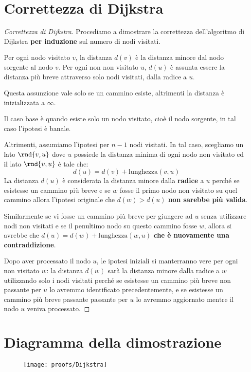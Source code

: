 \documentclass[\main/main.tex]{subfiles}
\begin{document}
\section{Correttezza di Dijkstra}
\begin{proof}[Correttezza di Dijkstra]
  Procediamo a dimostrare la correttezza dell'algoritmo di Dijkstra \textbf{per induzione} sul numero di nodi visitati.

  Per ogni nodo visitato \(v\), la distanza \(d(v)\) è la distanza minore dal nodo sorgente al nodo \(v\). Per ogni non non visitato \(u\), \(d(u)\) è assunta essere la distanza più breve attraverso solo nodi visitati, dalla radice a \(u\).

  Questa assunzione vale solo se un cammino esiste, altrimenti la distanza è inizializzata a \(\infty \).

  Il caso base è quando esiste solo un nodo visitato, cioè il nodo sorgente, in tal caso l'ipotesi è banale.

  Altrimenti, assumiamo l'ipotesi per \(n-1\) nodi visitati. In tal caso, scegliamo un lato \(\rnd{v,u}\) dove \(u\) possiede la distanza minima di ogni nodo non visitato ed il lato \(\rnd{v,u}\) è tale che:
  \[
    d(u) = d(v) + \text{lunghezza}(v, u)
  \]
  La distanza \(d(u)\) è considerata la distanza minore dalla \textbf{radice} a \(u\) perché se esistesse un cammino più breve e se \(w\) fosse il primo nodo non visitato su quel cammino allora l'ipotesi originale che \(d(w) > d(u)\) \textbf{non sarebbe più valida}.

  Similarmente se vi fosse un cammino più breve per giungere ad \(u\) senza utilizzare nodi non visitati e se il penultimo nodo su questo cammino fosse \(w\), allora si avrebbe che \(d(u) = d(w) + \text{lunghezza}(w, u)\) \textbf{che è nuovamente una contraddizione}.

  Dopo aver processato il nodo \(u\), le ipotesi iniziali si manterranno vere per ogni non visitato \(w\): la distanza \(d(w)\) sarà la distanza minore dalla radice a \(w\) utilizzando solo i nodi visitati perché se esistesse un cammino più breve non passante per \(u\) lo avremmo identificato precedentemente, e se esistesse un cammino più breve passante passante per \(u\) lo avremmo aggiornato mentre il nodo \(u\) veniva processato.
\end{proof}
\clearpage
\section{Diagramma della dimostrazione}
\begin{figure}
  \texttt{[image: proofs/Dijkstra]}
\end{figure}
\end{document}

